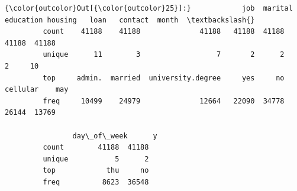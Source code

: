 \documentclass[8pt,onecolumn,aps,pra]{revtex4-1}
\begin{document}
\begin{Verbatim}[commandchars=\\\{\}]
{\color{outcolor}Out[{\color{outcolor}25}]:}            job  marital          education housing   loan   contact  month  \textbackslash{}
         count    41188    41188              41188   41188  41188     41188  41188   
         unique      11        3                  7       2      2         2     10   
         top     admin.  married  university.degree     yes     no  cellular    may   
         freq     10499    24979              12664   22090  34778     26144  13769   
         
                day\_of\_week      y  
         count        41188  41188  
         unique           5      2  
         top            thu     no  
         freq          8623  36548  
\end{Verbatim}
\end{document}
